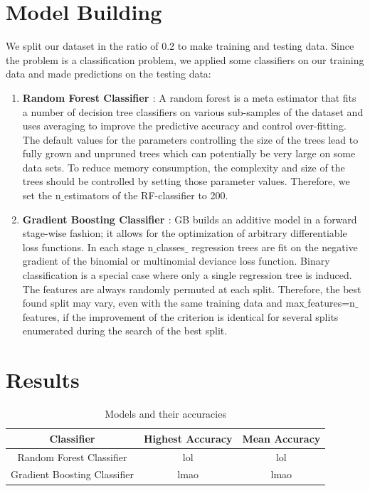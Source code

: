 \documentclass[conference]{IEEEtran}
\begin{document}
\section{Model Building}
We split our dataset in the ratio of 0.2 to make training and testing data.
Since the problem is a classification problem, we applied some classifiers on our training data and made predictions on the testing data: 
\begin{enumerate}
	\item \textbf{Random Forest Classifier \cite{rf}} : A random forest is a meta estimator that fits a number of decision tree classifiers on various sub-samples of the dataset and uses averaging to improve the predictive accuracy and control over-fitting. \\
	The default values for the parameters controlling the size of the trees lead to fully grown and unpruned trees which can potentially be very large on some data sets. To reduce memory consumption, the complexity and size of the trees should be controlled by setting those parameter values. Therefore, we set the n$\_$estimators of the RF-classifier to 200.\\
	\item \textbf{Gradient Boosting Classifier \cite{rf}} :  GB builds an additive model in a forward stage-wise fashion; it allows for the optimization of arbitrary differentiable loss functions. In each stage n$\_$classes$\_$ regression trees are fit on the negative gradient of the binomial or multinomial deviance loss function. Binary classification is a special case where only a single regression tree is induced.\\
	The features are always randomly permuted at each split. Therefore, the best found split may vary, even with the same training data and max$\_$features=n$\_$features, if the improvement of the criterion is identical for several splits enumerated during the search of the best split.
\end{enumerate}

\newpage
\section{Results}
\begin{table}[H]
	\begin{center}
		\caption{Models and their accuracies}
		\begin{tabular}{|c|c|c|}
			\hline
			\textbf{Classifier} & \textbf{Highest Accuracy} & \textbf{Mean Accuracy}\\
			\hline
			 Random Forest Classifier &  lol & lol\\
			 \hline
			 Gradient Boosting Classifier & lmao & lmao\\
			 \hline			
		\end{tabular}
	\end{center}
\end{table}



\end{document}
